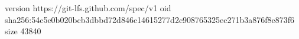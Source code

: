 version https://git-lfs.github.com/spec/v1
oid sha256:54c5e0b020bcb3dbbd72d846c14615277d2c908765325ec271b3a876f8e873f6
size 43840
